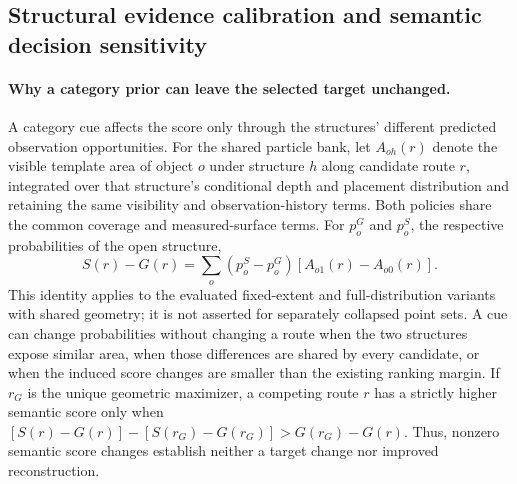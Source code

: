 \subsection{Structural evidence calibration and semantic decision sensitivity}
\label{supp:structure-temperature}

\paragraph{Why a category prior can leave the selected target unchanged.}
A category cue affects the score only through the structures' different predicted observation opportunities. For the shared particle bank, let $A_{oh}(r)$ denote the visible template area of object $o$ under structure $h$ along candidate route $r$, integrated over that structure's conditional depth and placement distribution and retaining the same visibility and observation-history terms. Both policies share the common coverage and measured-surface terms. For $p_o^G$ and $p_o^S$, the respective probabilities of the open structure,
\[
S(r)-G(r)=\sum_o (p_o^S-p_o^G)\left[A_{o1}(r)-A_{o0}(r)\right].
\]
This identity applies to the evaluated fixed-extent and full-distribution variants with shared geometry; it is not asserted for separately collapsed point sets. A cue can change probabilities without changing a route when the two structures expose similar area, when those differences are shared by every candidate, or when the induced score changes are smaller than the existing ranking margin. If $r_G$ is the unique geometric maximizer, a competing route $r$ has a strictly higher semantic score only when $[S(r)-G(r)]-[S(r_G)-G(r_G)]>G(r_G)-G(r)$. Thus, nonzero semantic score changes establish neither a target change nor improved reconstruction.

